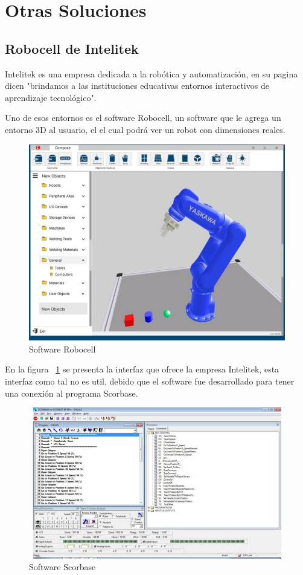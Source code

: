 \section{Otras Soluciones}
\subsection{Robocell de Intelitek}
Intelitek es una empresa dedicada a la robótica y automatización, en su pagina dicen "brindamos a las instituciones educativas entornos interactivos de aprendizaje tecnológico". 

Uno de esos entornos es el software Robocell, un software que le agrega un entorno 3D al usuario, el el cual podrá ver un robot con dimensiones reales.
\begin{figure}[ht]
\centering
\includegraphics[width=13cm]{figures/Robocell-768x588-1.jpg}
\caption{Software Robocell}
\label{fig:robocell}
\end{figure}

En la figura ~\ref{fig:robocell} se presenta la interfaz que ofrece la empresa Intelitek, esta interfaz como tal no es util, debido que el software fue desarrollado para tener una conexión al programa Scorbase.

\clearpage

\begin{figure}[ht]
\centering
\includegraphics[width=13cm, height=6.6cm]{figures/eL_RBTC_P_ScorbaseControllerUSBPro_644x350.jpg}
\caption{Software Scorbase}
\label{fig:scorbase}
\end{figure}

